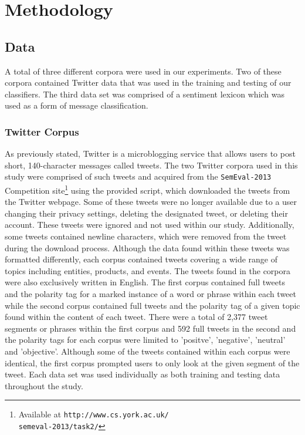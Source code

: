 \documentclass[11pt]{article}
\begin{document}
\section{Methodology}

\subsection{Data}
A total of three different corpora were used in our experiments. Two of these corpora contained Twitter data that was used in the training and testing of our classifiers. The third data set was comprised of a sentiment lexicon which was used as a form of message classification.

\subsubsection*{Twitter Corpus}
As previously stated, Twitter is a microblogging service that allows users to post short, 140-character messages called tweets.  The two Twitter corpora used in this study were comprised of such tweets and acquired from the {\tt SemEval-2013} Competition site\footnote{Available at {\tt http://www.cs.york.ac.uk/{\\}semeval-2013/task2/}} using the provided script, which downloaded the tweets from the Twitter webpage. Some of these tweets were no longer available due to a user changing their privacy settings, deleting the designated tweet, or deleting their account. These tweets were ignored and not used within our study. Additionally, some tweets contained newline characters, which were removed from the tweet during the download process. Although the data found within these tweets was formatted differently, each corpus contained tweets covering a wide range of topics including entities, products, and events. The tweets found in the corpora were also exclusively written in English. The first corpus contained full tweets and the polarity tag for a marked instance of a word or phrase within each tweet while the second corpus contained full tweets and the polarity tag of a given topic found within the content of each tweet. There were a total of 2,377 tweet segments or phrases within the first corpus and 592 full tweets in the second and the polarity tags for each corpus were limited to 'positve', 'negative', 'neutral' and 'objective'. Although some of the tweets contained within each corpus were identical, the first corpus prompted users to only look at the given segment of the tweet. Each data set was used individually as both training and testing data throughout the study.      
\end{document}
